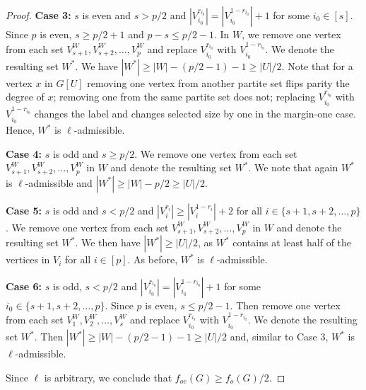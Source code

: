 \documentclass{article}
\newcommand{\2}{\vspace{0.2cm}}
\begin{document}
\begin{proof}
\2

{\bf Case 3:} $s$ is even and $s > p/2$ and $|V_{i_0}^{r_{i_0}}| = |V_{i_0}^{1-r_{i_0}}|+1$ for some $i_0 \in [s]$. Since $p$ is even, $s \ge p/2+1$ and $p-s \le p/2-1$.
In $W$, we remove one vertex from each set $V_{s+1}^W,V_{s+2}^W,\ldots , V_p^W$ and replace  $V_{i_0}^{r_{i_0}}$ with $V_{i_0}^{1-r_{i_0}}$. We denote the resulting set $W^*$.
We have $|W^*| \geq |W| - (p/2-1)-1 \geq |U| / 2$. Note that for a vertex $x$ in $G[U]$ removing one vertex from another partite set flips parity the degree of $x$; 
removing one from the same partite set does not; replacing $V_{i_0}^{r_{i_0}}$ with $V_{i_0}^{1-r_{i_0}}$  changes the label and changes selected size by one in the margin-one case.
Hence, $W^*$ is $\ell$-admissible. 



\2

{\bf Case 4:} $s$ is odd and $s \geq p/2$. We remove one vertex from each set $V_{s+1}^W,V_{s+2}^W,\ldots , V_p^W$ in $W$ and denote the resulting set $W^*$. We note that again $W^*$ is $\ell$-admissible and $|W^*| \geq |W| - p/2 \geq |U|/ 2$.

\2

{\bf Case 5:} $s$ is odd and $s < p/2$ and  $|V_i^{r_i}| \geq |V_i^{1-r_i}|+2$ for all $i \in \{s+1,s+2,\ldots,p\}$. 
We remove one vertex from each set $V_{s+1}^W,V_{s+2}^W,\ldots , V_p^W$ in $W$ and denote the resulting set $W^*$.
We then have $|W^*| \geq |U| / 2$, as $W^*$ contains at least half of the vertices in $V_i$ for all $i \in [p]$. 
As before, $W^*$ is $\ell$-admissible.

\2

{\bf Case 6:} $s$ is odd, $s < p/2$ and $|V_{i_0}^{r_{i_0}}| = |V_{i_0}^{1-r_{i_0}}|+1$ for some ${i_0} \in \{s+1,s+2,\ldots,p\}$. Since $p$ is even, $s \le p/2-1$.
Then remove one vertex from each set $V_{1}^W,V_{2}^W,\ldots , V_s^W$ and replace $V_{i_0}^{r_{i_0}}$ with $V_{i_0}^{1-r_{i_0}}$. We denote the resulting set $W^*$.
Then $|W^*| \geq |W| - (p/2-1)-1 \geq |U| / 2$ and, similar to Case 3, $W^*$ is $\ell$-admissible. 

Since $\ell$ is arbitrary, we conclude that $f_{oe}(G) \geq f_o(G)/2$.
\end{proof}




\end{document}
